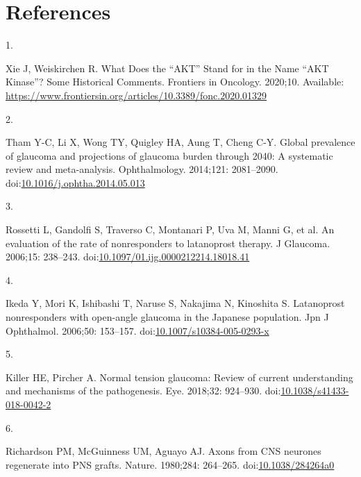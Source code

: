\documentclass[
  12pt,
  a4paper,
]{book}
\newlength{\cslhangindent}
\newlength{\csllabelwidth}
\newlength{\cslentryspacingunit} %
\newenvironment{CSLReferences}[2] %
 {%
  \setlength{\parindent}{0pt}
  \ifodd #1
  \let\oldpar\par
  \def\par{\hangindent=\cslhangindent\oldpar}
  \fi
  \setlength{\parskip}{#2\cslentryspacingunit}
 }%
 {}
\newcommand{\CSLLeftMargin}[1]{\parbox[t]{\csllabelwidth}{#1}}
\newcommand{\CSLRightInline}[1]{\parbox[t]{\linewidth - \csllabelwidth}{#1}\break}
\begin{document}
\hypertarget{BIB}{%
\chapter*{References}\label{BIB}}


\hypertarget{refs}{}
\begin{CSLReferences}{0}{0}
\leavevmode{}%
\CSLLeftMargin{1. }%
\CSLRightInline{Xie J, Weiskirchen R. What {Does} the {``{AKT}''} {Stand} for in the {Name} {``{AKT Kinase}''}? {Some Historical Comments}. Frontiers in Oncology. 2020;10. Available: \url{https://www.frontiersin.org/articles/10.3389/fonc.2020.01329}}

\leavevmode{}%
\CSLLeftMargin{2. }%
\CSLRightInline{Tham Y-C, Li X, Wong TY, Quigley HA, Aung T, Cheng C-Y. Global prevalence of glaucoma and projections of glaucoma burden through 2040: A systematic review and meta-analysis. Ophthalmology. 2014;121: 2081--2090. doi:\href{https://doi.org/10.1016/j.ophtha.2014.05.013}{10.1016/j.ophtha.2014.05.013}}

\leavevmode{}%
\CSLLeftMargin{3. }%
\CSLRightInline{Rossetti L, Gandolfi S, Traverso C, Montanari P, Uva M, Manni G, et al. An evaluation of the rate of nonresponders to latanoprost therapy. J Glaucoma. 2006;15: 238--243. doi:\href{https://doi.org/10.1097/01.ijg.0000212214.18018.41}{10.1097/01.ijg.0000212214.18018.41}}

\leavevmode{}%
\CSLLeftMargin{4. }%
\CSLRightInline{Ikeda Y, Mori K, Ishibashi T, Naruse S, Nakajima N, Kinoshita S. Latanoprost nonresponders with open-angle glaucoma in the {Japanese} population. Jpn J Ophthalmol. 2006;50: 153--157. doi:\href{https://doi.org/10.1007/s10384-005-0293-x}{10.1007/s10384-005-0293-x}}

\leavevmode{}%
\CSLLeftMargin{5. }%
\CSLRightInline{Killer HE, Pircher A. Normal tension glaucoma: Review of current understanding and mechanisms of the pathogenesis. Eye. 2018;32: 924--930. doi:\href{https://doi.org/10.1038/s41433-018-0042-2}{10.1038/s41433-018-0042-2}}

\leavevmode{}%
\CSLLeftMargin{6. }%
\CSLRightInline{Richardson PM, McGuinness UM, Aguayo AJ. Axons from {CNS} neurones regenerate into {PNS} grafts. Nature. 1980;284: 264--265. doi:\href{https://doi.org/10.1038/284264a0}{10.1038/284264a0}}


\end{CSLReferences}
\end{document}
